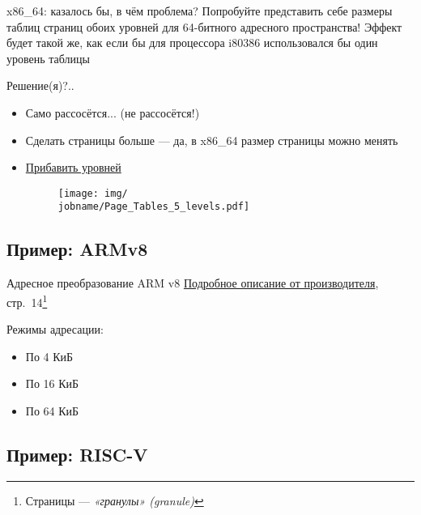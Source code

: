 \documentclass[xetex,aspectratio=43]{beamer}
\begin{document}
\begin{frame}{x86\_64: казалось бы, в чём проблема?}
    Попробуйте представить себе размеры таблиц страниц обоих уровней для 64-битного адресного пространства! Эффект будет такой же, как если бы для процессора i80386 использовался бы один уровень таблицы

    Решение(я)?..

    \begin{itemize}
        \pause
        \item Само рассосётся... (не рассосётся!) %
        \pause
        \item Сделать страницы больше --- да, в x86\_64 размер страницы можно менять
        \pause
        \item \href{https://en.wikipedia.org/wiki/Intel_5-level_paging}{Прибавить уровней}
        \begin{figure}
            \texttt{[image: img/\\jobname/Page\_Tables\_5\_levels.pdf]}
        \end{figure}
    \end{itemize}



\end{frame}

\subsection{Пример: ARMv8}

\begin{frame}{Адресное преобразование ARM v8}
    \href{https://documentation-service.arm.com/static/5efa1d23dbdee951c1ccdec5}{Подробное описание от производителя}, стр.~14\footnote{Страницы --- \emph{«гранулы» (granule)}}

    Режимы адресации:
    \begin{itemize}
        \item По 4 КиБ
        \item По 16 КиБ
        \item По 64 КиБ
    \end{itemize}
\end{frame}

\subsection{Пример: RISC-V}
\end{document}
